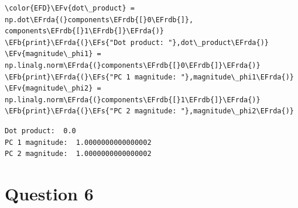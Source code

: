 \documentclass[11pt]{article}
\newcommand{\EFs}[1]{\textcolor{EFs}{#1}} %
\newcommand{\EFb}[1]{\textcolor{EFb}{#1}} %
\newcommand{\EFv}[1]{\textcolor{EFv}{#1}} %
\newcommand{\EFrda}[1]{\textcolor{EFrda}{#1}} %
\newcommand{\EFrdb}[1]{\textcolor{EFrdb}{#1}} %
\begin{document}
\begin{Code}
\begin{Verbatim}
\color{EFD}\EFv{dot\_product} = np.dot\EFrda{(}components\EFrdb{[}0\EFrdb{]}, components\EFrdb{[}1\EFrdb{]}\EFrda{)}
\EFb{print}\EFrda{(}\EFs{"Dot product: "},dot\_product\EFrda{)}
\EFv{magnitude\_phi1} = np.linalg.norm\EFrda{(}components\EFrdb{[}0\EFrdb{]}\EFrda{)}
\EFb{print}\EFrda{(}\EFs{"PC 1 magnitude: "},magnitude\_phi1\EFrda{)}
\EFv{magnitude\_phi2} = np.linalg.norm\EFrda{(}components\EFrdb{[}1\EFrdb{]}\EFrda{)}
\EFb{print}\EFrda{(}\EFs{"PC 2 magnitude: "},magnitude\_phi2\EFrda{)}
\end{Verbatim}
\end{Code}

\begin{verbatim}
Dot product:  0.0
PC 1 magnitude:  1.0000000000000002
PC 2 magnitude:  1.0000000000000002
\end{verbatim}
\section*{Question 6}
\label{sec:org67d7f2d}
\end{document}
